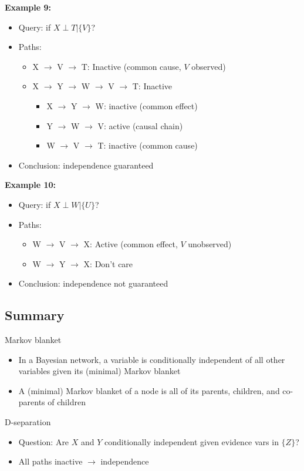 \documentclass[10pt]{article}
\begin{document}
\textbf{Example 9:}
\begin{itemize}
	\item Query: if $X \perp T | \{V\}$?
	\item Paths: 
	\begin{itemize}
	    \item X $\rightarrow$ V $\rightarrow$ T:  Inactive (common cause, $V$ observed)
	    \item X $\rightarrow$ Y $\rightarrow$ W $\rightarrow$ V $\rightarrow$ T:  Inactive
	    \begin{itemize}
	        \item X $\rightarrow$ Y $\rightarrow$ W: inactive (common effect)
	        \item Y $\rightarrow$ W $\rightarrow$ V: active (causal chain)
	        \item W $\rightarrow$ V $\rightarrow$ T: inactive (common cause)
        \end{itemize}
    \end{itemize}
    \item Conclusion: independence guaranteed
\end{itemize}
\textbf{Example 10:}
\begin{itemize}
	\item Query: if $X \perp W | \{U\}$?
	\item Paths: 
	\begin{itemize}
	    \item W $\rightarrow$ V $\rightarrow$ X:  Active (common effect, $V$ unobserved)
	    \item W $\rightarrow$ Y $\rightarrow$ X: Don't care
    \end{itemize}
    \item Conclusion: independence not guaranteed
\end{itemize}

\subsection*{Summary}
Markov blanket
\begin{itemize}
	\item In a Bayesian network, a variable is conditionally independent of all other variables given its (minimal) Markov blanket
	\item A (minimal) Markov blanket of a node is all of its parents, children, and co-parents of children
\end{itemize}
D-separation
\begin{itemize}
	\item Question: Are $X$ and $Y$ conditionally independent given evidence vars in $\{Z\}$?
	\item All paths inactive $\rightarrow$ independence
\end{itemize}
\end{document}
